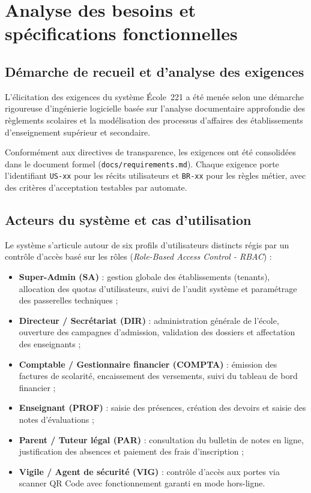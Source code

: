 \chapter{Analyse des besoins et spécifications fonctionnelles}

\section{Démarche de recueil et d'analyse des exigences}

L'élicitation des exigences du système École~221 a été menée selon une démarche rigoureuse d'ingénierie logicielle basée sur l'analyse documentaire approfondie des règlements scolaires et la modélisation des processus d'affaires des établissements d'enseignement supérieur et secondaire.

Conformément aux directives de transparence, les exigences ont été consolidées dans le document formel (\nolinkurl{docs/requirements.md}). Chaque exigence porte l'identifiant \texttt{US-xx} pour les récits utilisateurs et \texttt{BR-xx} pour les règles métier, avec des critères d'acceptation testables par automate.

\section{Acteurs du système et cas d'utilisation}

Le système s'articule autour de six profils d'utilisateurs distincts régis par un contrôle d'accès basé sur les rôles (\emph{Role-Based Access Control - RBAC}) :

\begin{itemize}
  \item \textbf{Super-Admin (SA)} : gestion globale des établissements (tenants), allocation des quotas d'utilisateurs, suivi de l'audit système et paramétrage des passerelles techniques ;
  \item \textbf{Directeur / Secrétariat (DIR)} : administration générale de l'école, ouverture des campagnes d'admission, validation des dossiers et affectation des enseignants ;
  \item \textbf{Comptable / Gestionnaire financier (COMPTA)} : émission des factures de scolarité, encaissement des versements, suivi du tableau de bord financier ;
  \item \textbf{Enseignant (PROF)} : saisie des présences, création des devoirs et saisie des notes d'évaluations ;
  \item \textbf{Parent / Tuteur légal (PAR)} : consultation du bulletin de notes en ligne, justification des absences et paiement des frais d'inscription ;
  \item \textbf{Vigile / Agent de sécurité (VIG)} : contrôle d'accès aux portes via scanner QR Code avec fonctionnement garanti en mode hors-ligne.
\end{itemize}


